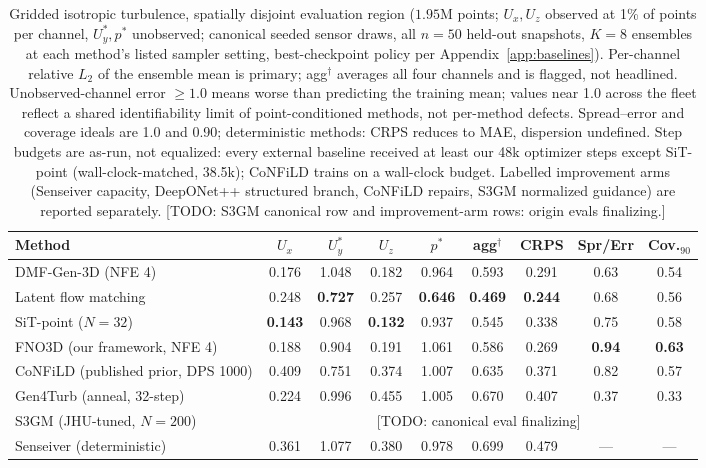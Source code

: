 \documentclass{article} %
\newcommand{\todo}[1]{{\color{red}[TODO: #1]}}
\newcommand{\model}{DMF-Gen-3D}
\begin{document}
\begin{table}[tbp]
\caption{Gridded isotropic turbulence, spatially disjoint evaluation region ($1.95$M points; $U_x,U_z$ observed at 1\% of points per channel, $U_y^*,p^*$ unobserved; canonical seeded sensor draws, all $n{=}50$ held-out snapshots, $K{=}8$ ensembles at each method's listed sampler setting, best-checkpoint policy per Appendix~\ref{app:baselines}). Per-channel relative $L_2$ of the ensemble mean is primary; agg$^\dagger$ averages all four channels and is flagged, not headlined. Unobserved-channel error $\ge 1.0$ means worse than predicting the training mean; values near 1.0 across the fleet reflect a shared identifiability limit of point-conditioned methods, not per-method defects. Spread--error and coverage ideals are 1.0 and 0.90; deterministic methods: CRPS reduces to MAE, dispersion undefined. Step budgets are as-run, not equalized: every external baseline received at least our 48k optimizer steps except SiT-point (wall-clock-matched, 38.5k); CoNFiLD trains on a wall-clock budget. Labelled improvement arms (Senseiver capacity, DeepONet++ structured branch, CoNFiLD repairs, S3GM normalized guidance) are reported separately. \todo{S3GM canonical row and improvement-arm rows: origin evals finalizing.}}
\label{tab:jhu}
\begin{center}
\footnotesize
\setlength{\tabcolsep}{3.4pt}
\begin{tabular}{lcccccccc}
\toprule
Method & $U_x$ & $U_y^*$ & $U_z$ & $p^*$ & agg$^\dagger$ & CRPS & Spr/Err & Cov.$_{90}$ \\
\midrule
\model{} (NFE 4) & 0.176 & 1.048 & 0.182 & 0.964 & 0.593 & 0.291 & 0.63 & 0.54 \\
Latent flow matching & 0.248 & \textbf{0.727} & 0.257 & \textbf{0.646} & \textbf{0.469} & \textbf{0.244} & 0.68 & 0.56 \\
SiT-point ($N{=}32$) & \textbf{0.143} & 0.968 & \textbf{0.132} & 0.937 & 0.545 & 0.338 & 0.75 & 0.58 \\
FNO3D (our framework, NFE 4) & 0.188 & 0.904 & 0.191 & 1.061 & 0.586 & 0.269 & \textbf{0.94} & \textbf{0.63} \\
CoNFiLD (published prior, DPS 1000) & 0.409 & 0.751 & 0.374 & 1.007 & 0.635 & 0.371 & 0.82 & 0.57 \\
Gen4Turb (anneal, 32-step) & 0.224 & 0.996 & 0.455 & 1.005 & 0.670 & 0.407 & 0.37 & 0.33 \\
S3GM (JHU-tuned, $N{=}200$) & \multicolumn{8}{c}{\todo{canonical eval finalizing}} \\
\midrule
Senseiver (deterministic) & 0.361 & 1.077 & 0.380 & 0.978 & 0.699 & 0.479 & --- & --- \\

\end{tabular}
\end{center}
\end{table}
\end{document}
